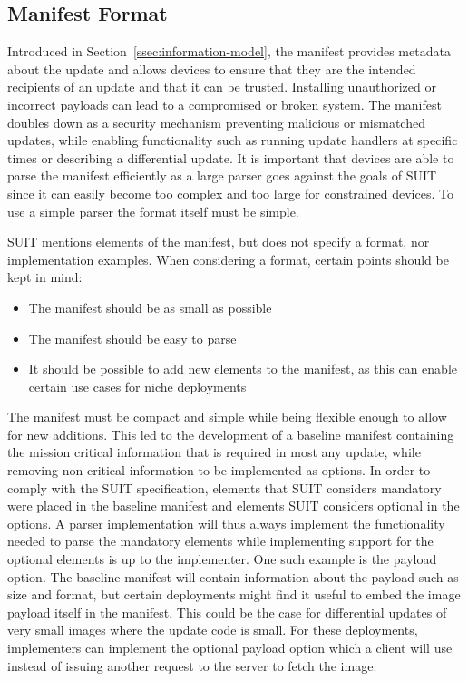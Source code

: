 \documentclass[0-thesis.tex]{subfiles}
\begin{document}
\subsection{Manifest Format}
\label{ssec:manifest-format}
Introduced in Section~\ref{ssec:information-model}, the manifest provides metadata about
the update and allows devices to ensure that they are the intended recipients of an update
and that it can be trusted. Installing unauthorized or incorrect payloads can lead to a
compromised or broken system. The manifest doubles down as a security mechanism preventing
malicious or mismatched updates, while enabling functionality such as running update
handlers at specific times or describing a differential update. It is important that
devices are able to parse the manifest efficiently as a large parser goes against the
goals of SUIT since it can easily become too complex and too large for constrained
devices. To use a simple parser the format itself must be simple.

SUIT mentions elements of the manifest, but does not specify a format, nor implementation
examples. When considering a format, certain points should be kept in mind:

\begin{itemize}
        \item The manifest should be as small as possible
        \item The manifest should be easy to parse
        \item It should be possible to add new elements to the manifest, as this can
                enable certain use cases for niche deployments
\end{itemize}

The manifest must be compact and simple while being flexible enough to allow for new
additions. This led to the development of a baseline manifest containing the mission
critical information that is required in most any update, while removing non-critical
information to be implemented as options. In order to comply with the SUIT specification,
elements that SUIT considers mandatory were placed in the baseline manifest and elements
SUIT considers optional in the options. A parser implementation will thus always implement
the functionality needed to parse the mandatory elements while implementing support for
the optional elements is up to the implementer. One such example is the payload option.
The baseline manifest will contain information about the payload such as size and format,
but certain deployments might find it useful to embed the image payload itself in the
manifest. This could be the case for differential updates of very small images where the
update code is small. For these deployments, implementers can implement the optional
payload option which a client will use instead of issuing another request to the server to
fetch the image.
\end{document}
